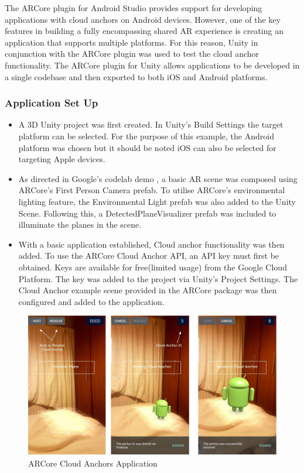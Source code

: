 The ARCore plugin for Android Studio provides support for developing applications with cloud anchors on Android devices. However, one of the key features in building a fully encompassing shared AR experience is creating an application that supports multiple platforms. For this reason, Unity in conjunction with the ARCore plugin was used to test the cloud anchor functionality. The ARCore plugin for Unity allows applications to be developed in a single codebase and then exported to both iOS and Android platforms. 

\subsubsection{Application Set Up}

\begin{itemize}
    \item A 3D Unity project was first created. In Unity’s Build Settings the target platform can be selected. For the purpose of this example, the Android platform was chosen but it should be noted iOS can also be selected for targeting Apple devices. 
    
    \item As directed in Google’s codelab demo \cite{arcore_codelab}, a basic AR scene was composed using ARCore’s First Person Camera prefab. To utilise ARCore’s environmental lighting feature, the Environmental Light prefab was also added to the Unity Scene.  Following this, a DetectedPlaneVisualizer prefab was included to illuminate the planes in the scene. 

    
    \item  With a basic application established, Cloud anchor functionality was then added. To use the ARCore Cloud Anchor API, an API key must first be obtained. Keys are available for free(limited usage) from the Google Cloud Platform. The key was added to the project via Unity’s Project Settings. The Cloud Anchor example scene provided in the ARCore package was then configured and added to the application. 
    
    
\end{itemize}

\begin{figure}[!ht]
\caption{ARCore Cloud Anchors Application}
\centering
\includegraphics[width=1\textwidth]{images/cloud_anchors.JPG}
\end{figure}


